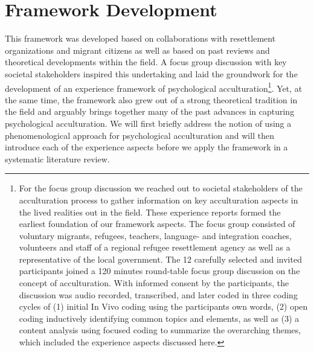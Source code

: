 \documentclass[man, 12pt, a4paper, mask]{apa7}
\begin{document}
\section{Framework Development} 
This framework was developed based on collaborations with resettlement organizations and migrant citizens as well as based on past reviews and theoretical developments within the field. A focus group discussion with key societal stakeholders inspired this undertaking and laid the groundwork for the development of an experience framework of psychological acculturation\footnote{For the focus group discussion we reached out to societal stakeholders of the acculturation process to gather information on key acculturation aspects in the lived realities out in the field. These experience reports formed the earliest foundation of our framework aspects. The focus group consisted of voluntary migrants, refugees, teachers, language- and integration coaches, volunteers and staff of a regional refugee resettlement agency as well as a representative of the local government. The 12 carefully selected and invited participants joined a 120 minutes round-table focus group discussion on the concept of acculturation. With informed consent by the participants, the discussion was audio recorded, transcribed, and later coded in three coding cycles of (1) initial In Vivo coding using the participants own words, (2) open coding inductively identifying common topics and elements, as well as (3) a content analysis using focused coding to summarize the overarching themes, which included the experience aspects discussed here.}. Yet, at the same time, the framework also grew out of a strong theoretical tradition in the field and arguably brings together many of the past advances in capturing psychological acculturation. We will first briefly address the notion of using a phenomenological approach for psychological acculturation and will then introduce each of the experience aspects before we apply the framework in a systematic literature review.
\end{document}
